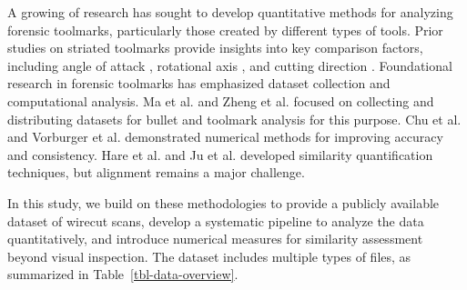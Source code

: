 \documentclass[fleqn,10pt]{wlscirep}
\begin{document}
A growing of research has sought to develop quantitative methods for
analyzing forensic toolmarks, particularly those created by different
types of tools. Prior studies on striated toolmarks provide insights
into key comparison factors, including angle of attack
\citep{baikerToolmarkVariabilityQuality2015a}, rotational axis
\citep{garciaInfluenceAxialRotation2017}, and cutting direction
\citep{cuellarAlgorithmForensicToolmark2024}. Foundational research in
forensic toolmarks has emphasized dataset collection and computational
analysis. Ma et al. \citep{maNISTBulletSignature2004} and Zheng et al.
\citep{zhengNISTBallisticsToolmark2016} focused on collecting and
distributing datasets for bullet and toolmark analysis for this purpose.
Chu et al. \citep{chuAutomaticIdentificationBullet2013} and Vorburger et
al. \citep{vorburgerApplicationsCrosscorrelationFunctions2011}
demonstrated numerical methods for improving accuracy and consistency.
Hare et al. \citep{hareAutomaticMatchingBullet2017} and Ju et al.
\citep{juJournalOpenSourceImplementation2022} developed similarity
quantification techniques, but alignment remains a major challenge.

In this study, we build on these methodologies to provide a publicly
available dataset of wirecut scans, develop a systematic pipeline to
analyze the data quantitatively, and introduce numerical measures for
similarity assessment beyond visual inspection. The dataset includes
multiple types of files, as summarized in Table~\ref{tbl-data-overview}.
\end{document}

